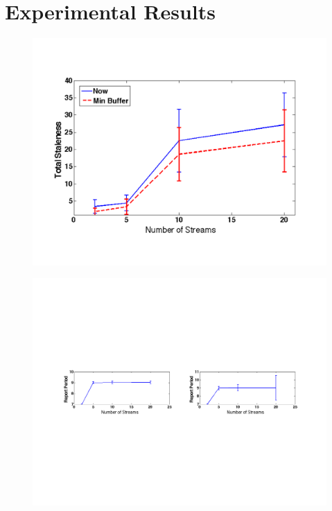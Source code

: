 \section{Experimental Results}

\begin{figure}[t!] %
\centering
\includegraphics[width=0.9\columnwidth]{figs/staleness_vs_numstreams}
\caption{}
\label{fig:stalevsstreams}
\end{figure}

\begin{figure}[t!] %
\centering
\includegraphics[width=1.0	\columnwidth]{figs/period_vs_streams}
\caption{}
\label{fig:report_periods}
\end{figure}